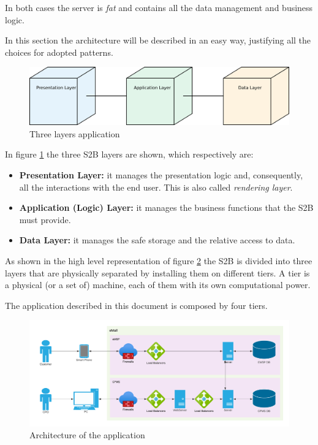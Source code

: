 In both cases the server is \textit{fat} and contains all the data management and business logic.

In this section the architecture will be described in an easy way, justifying all the choices for adopted patterns.

\begin{figure}[H]
    \begin{center}
        \includegraphics[width=\textwidth]{img/3-tier.png}
        \caption{Three layers application}\label{three_tier_desc}
    \end{center}
\end{figure}

In figure \ref{three_tier_desc} the three S2B layers are shown, which respectively are:
\begin{itemize}
    \item \textbf{Presentation Layer:} it manages the presentation logic and, consequently, all the interactions with the end user. This is also called \textit{rendering layer}.
    \item \textbf{Application (Logic) Layer:} it manages the business functions that the S2B must provide.
    \item \textbf{Data Layer:} it manages the safe storage and the relative access to data.
\end{itemize}

As shown in the high level representation of figure \ref{architecture_overview} the S2B is divided into three layers that are physically separated by installing them on different tiers. A tier is a physical (or a set of) machine, each of them with its own computational power.

The application described in this document is composed by four tiers.

\begin{figure}[H]
    \includegraphics[width=\textwidth]{img/ArchitectureOverview.png}
    \caption{Architecture of the application}\label{architecture_overview}
\end{figure}    


